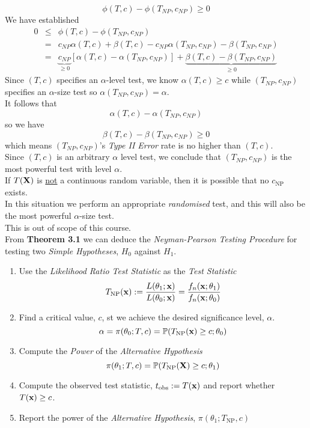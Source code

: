 \documentclass[11pt,a4paper]{article}
\begin{document}
$$\phi(T,c)-\phi(T_{NP},c_{NP})\geq0$$
We have established
\[\begin{array}{rcl}
0&\leq&\phi(T,c)-\phi(T_{NP},c_{NP})\\
&=&c_{NP}\alpha(T,c)+\beta(T,c)-c_{NP}\alpha(T_{NP},c_{NP})-\beta(T_{NP},c_{NP})\\
&=&\underbrace{c_{NP}}_{\geq0}[\alpha(T,c)-\alpha(T_{NP},c_{NP})]+\underbrace{\beta(T,c)-\beta(T_{NP},c_{NP})}_{\geq0}
\end{array}\]
Since $(T,c)$ specifies an $\alpha$-level test, we know $\alpha(T,c)\geq c$ while $(T_{NP},c_{NP})$ specifies an $\alpha$-size test so $\alpha(T_{NP},c_{NP})=\alpha$.\\
It follows that
$$\alpha(T,c)-\alpha(T_{NP},c_{NP})$$
so we have
$$\beta(T,c)-\beta(T_{NP},c_{NP})\geq0$$
which means $(T_{NP},c_{NP})$'s \textit{Type II Error} rate is no higher than $(T,c)$.\\
Since $(T,c)$ is an arbitrary $\alpha$ level test, we conclude that $(T_{NP},c_{NP})$ is the most powerful test with level $\alpha$.\proved\\

If $T(\textbf{X})$ is \underline{not} a continuous random variable, then it is possible that no $c_\text{NP}$ exists.\\
In this situation we perform an appropriate \textit{randomised} test, and this will also be the most powerful $\alpha$-size test.\\
\nb This is out of scope of this course.\\

From \textbf{Theorem 3.1} we can deduce the \textit{Neyman-Pearson Testing Procedure} for testing two \textit{Simple Hypotheses}, $H_0$ against $H_1$.
\begin{enumerate}
	\item Use the \textit{Likelihood Ratio Test Statistic} as the \textit{Test Statistic}
	$$T_\text{NP}(\textbf{x}):=\frac{L(\theta_1;\textbf{x})}{L(\theta_0;\textbf{x})}=\frac{f_n(\textbf{x};\theta_1)}{f_n(\textbf{x};\theta_0)}$$
	\item Find a critical value, $c$, st we achieve the desired significance level, $\alpha$.
	$$\alpha=\pi(\theta_0;T,c)=\mathbb{P}(T_\text{NP}(\textbf{x})\geq c;\theta_0)$$
	\item Compute the \textit{Power} of the \textit{Alternative Hypothesis}
	$$\pi(\theta_1;T,c)=\mathbb{P}(T_\text{NP}(\textbf{X})\geq c;\theta_1)$$
	\item Compute the observed test statistic, $t_\text{obs}:=T(\textbf{x})$ and report whether $T(\textbf{x})\geq c$.
	\item Report the power of the \textit{Alternative Hypothesis}, $\pi(\theta_1;T_\text{NP},c)$
\end{enumerate}
\end{document}
